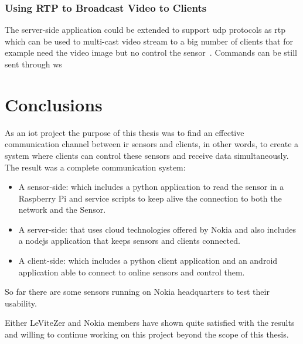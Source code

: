 \documentclass[hidelinks,11pt,a4paper,oneside,article]{memoir}
\begin{document}
\subsection{Using RTP to Broadcast Video to Clients}
The server-side application could be extended to support \gls{udp} protocols as \gls{rtp} which can be used to multi-cast video stream to a big number of clients that for example need the video image but no control the sensor~\cite[298]{hardy2013networks}. Commands can be still sent through \gls{ws} 

\clearpage\chapter{Conclusions}
As an \gls{iot} project the purpose of this thesis was to find an effective communication channel between \gls{ir} sensors and clients, in other words, to create a system where clients can control these sensors and receive data simultaneously. The result was a complete communication system:
\begin{itemize}
	\item A sensor-side: which includes a \gls{python} application to read the sensor in a Raspberry Pi and service scripts to keep alive the connection to both the network and the Sensor.
	\item A server-side: that uses cloud technologies offered by Nokia and also includes a \gls{nodejs} application that keeps sensors and clients connected.
	\item A client-side: which includes a \gls{python} client application and an \gls{android} application able to connect to online sensors and control them.
\end{itemize}
 So far there are some sensors running on Nokia headquarters to test their usability.
 
 Either LeViteZer and Nokia members have shown quite satisfied with the results and willing to continue working on this project beyond the scope of this thesis.
 
\end{document}
